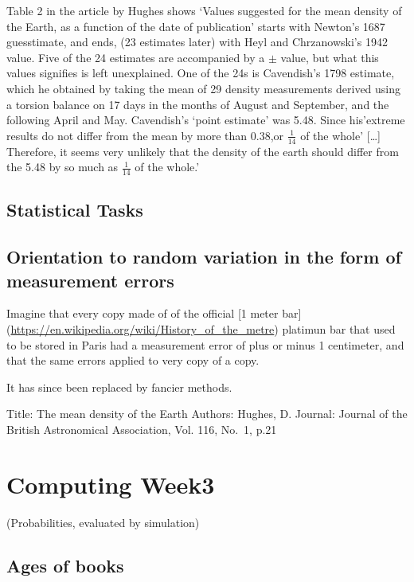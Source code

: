 \documentclass[]{book}
\begin{document}
Table 2 in the article by Hughes shows `Values suggested for the mean density of the Earth, as a function of the date of publication' starts with Newton's 1687 guesstimate, and ends, (23 estimates later) with Heyl and Chrzanowski's 1942 value.
Five of the 24 estimates are accompanied by a \(\pm\) value, but what this values signifies is left unexplained. One of the 24s is Cavendish's 1798 estimate, which he obtained by taking the mean of 29 density measurements derived using a torsion balance on 17 days in the months of August and September, and the following April and May. Cavendish's `point estimate' was 5.48. Since his'extreme results do not differ from the mean by more than 0.38,or \(\frac{1}{14}\) of the whole' {[}\ldots{}{]} Therefore, it seems very unlikely that the density of the earth should differ from the 5.48 by so much as \(\frac{1}{14}\) of the whole.'

\hypertarget{statistical-tasks}{%
\section{Statistical Tasks}\label{statistical-tasks}}

\hypertarget{orientation-to-random-variation-in-the-form-of-measurement-errors}{%
\section{Orientation to random variation in the form of measurement errors}\label{orientation-to-random-variation-in-the-form-of-measurement-errors}}

Imagine that every copy made of of the official {[}1 meter bar{]} (\url{https://en.wikipedia.org/wiki/History_of_the_metre}) platimun bar that used to be stored in Paris had a measurement error of plus or minus 1 centimeter, and that the same errors applied to very copy of a copy.

It has since been replaced by fancier methods.

Title: The mean density of the Earth
Authors: Hughes, D.
Journal: Journal of the British Astronomical Association, Vol. 116, No.~1, p.21

\hypertarget{computing03}{%
\chapter{Computing Week3}\label{computing03}}

(Probabilities, evaluated by simulation)

\hypertarget{ages-of-books}{%
\section{Ages of books}\label{ages-of-books}}
\end{document}
